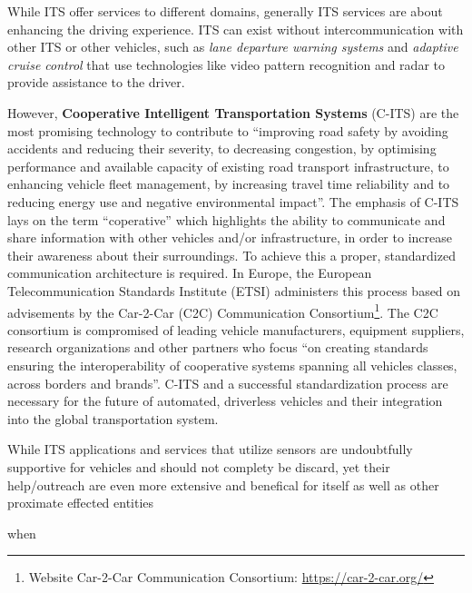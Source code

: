 While ITS offer services to different domains, generally ITS services are about enhancing the driving experience. ITS can exist without intercommunication with other ITS or other vehicles, such as \textit{lane departure warning systems} and \textit{adaptive cruise control} that use technologies like video pattern recognition and radar to provide assistance to the driver.

However, \textbf{Cooperative Intelligent Transportation Systems} (C-ITS) are the most promising technology to contribute to ``improving road safety by avoiding accidents and reducing their severity, to decreasing congestion, by optimising performance and available capacity of existing road transport infrastructure, to enhancing vehicle fleet management, by increasing travel time reliability and to reducing energy use and negative environmental impact''.
The emphasis of C-ITS lays on the term ``coperative'' which highlights the ability to communicate and share information with other vehicles and/or infrastructure, in order to increase their awareness about their surroundings.
To achieve this a proper, standardized communication architecture is required. In Europe, the European Telecommunication Standards Institute (ETSI) administers this process based on advisements by the Car-2-Car (C2C) Communication Consortium\footnote{Website Car-2-Car Communication Consortium: \url{https://car-2-car.org/}}.
The C2C consortium is compromised of leading vehicle manufacturers, equipment suppliers, research organizations and other partners who focus ``on creating standards ensuring the interoperability of cooperative systems spanning all vehicles classes, across borders and brands''\cite{}. %
C-ITS and a successful standardization process are necessary for the future of automated, driverless vehicles and their integration into the global transportation system.

While ITS applications and services that utilize sensors are undoubtfully supportive for vehicles and should not complety be discard, yet their help/outreach are even more extensive and benefical 
for itself
as well as other proximate effected entities

when


